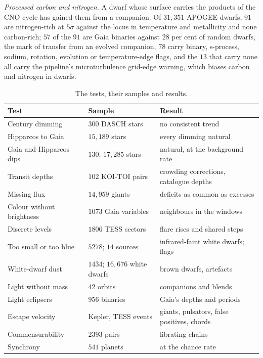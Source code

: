 \documentclass[3p,11pt]{elsarticle}
\begin{document}
\emph{Processed carbon and nitrogen.} A dwarf whose surface carries the products of the
CNO cycle has gained them from a companion. Of $31{,}351$ APOGEE dwarfs, $91$ are
nitrogen-rich at $5\sigma$ against the locus in temperature and metallicity and none
carbon-rich; $57$ of the $91$ are Gaia binaries against $28$ per cent of random dwarfs, the
mark of transfer from an evolved companion, $78$ carry binary, s-process, sodium,
rotation, evolution or temperature-edge flags, and the $13$ that carry none all carry
the pipeline's microturbulence grid-edge warning, which biases carbon and nitrogen in
dwarfs.

\begin{table}[t]
\centering\small
\caption{The tests, their samples and results.}
\label{tab:tests}
\begin{tabular}{>{\raggedright\arraybackslash}p{} >{\raggedright\arraybackslash}p{} >{\raggedright\arraybackslash}p{}}
\toprule
Test & Sample & Result \\
\midrule
Century dimming & $300$ DASCH stars & no consistent trend \\
Hipparcos to Gaia & $15{,}189$ stars & every dimming natural \\
Gaia and Hipparcos dips & $130$; $17{,}285$ stars & natural, at the background rate \\
Transit depths & $102$ KOI-TOI pairs & crowding corrections, catalogue depths \\
Missing flux & $14{,}959$ giants & deficits as common as excesses \\
Colour without brightness & $1073$ Gaia variables & neighbours in the windows \\
Discrete levels & $1806$ TESS sectors & flare rises and shared steps \\
Too small or too blue & $5278$; $14$ sources & infrared-faint white dwarfs; flags \\
White-dwarf dust & $1434$; $16{,}676$ white dwarfs & brown dwarfs, artefacts \\
Light without mass & $42$ orbits & companions and blends \\
Light eclipsers & $956$ binaries & Gaia's depths and periods \\
Escape velocity & Kepler, TESS events & giants, pulsators, false positives, chords \\
Commensurability & $2393$ pairs & librating chains \\
Synchrony & $541$ planets & at the chance rate \\

\end{tabular}
\end{table}
\end{document}

